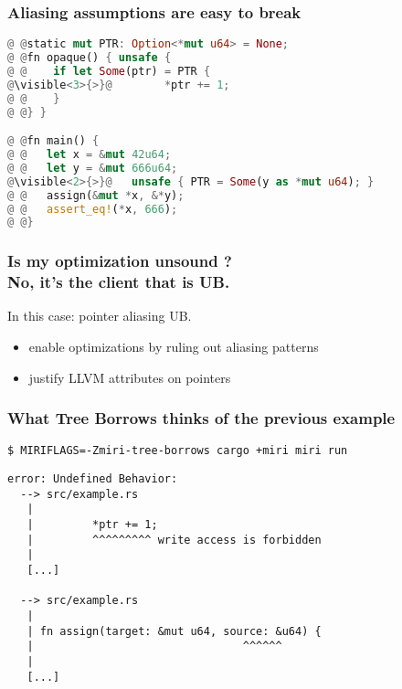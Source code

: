 \begin{frame}[fragile]
    \frametitle{Aliasing assumptions are easy to break}
    \begin{block}{}
        \begin{lstlisting}[language=rust, escapechar=@]
@ @static mut PTR: Option<*mut u64> = None;
@ @fn opaque() { unsafe {
@ @    if let Some(ptr) = PTR {
@\visible<3>{>}@        *ptr += 1;
@ @    }
@ @} }

@ @fn main() {
@ @   let x = &mut 42u64;
@ @   let y = &mut 666u64;
@\visible<2>{>}@   unsafe { PTR = Some(y as *mut u64); }
@ @   assign(&mut *x, &*y);
@ @   assert_eq!(*x, 666);
@ @}
        \end{lstlisting}
    \end{block}
\end{frame}

\begin{frame}
    \frametitle{Is my optimization unsound ?\\No, it's the client that is UB.}
    In this case: pointer aliasing UB.

    \begin{itemize}
        \item enable optimizations by ruling out aliasing patterns
        \item justify LLVM attributes on pointers
    \end{itemize}
\end{frame}

\begin{frame}[fragile]
    \frametitle{What Tree Borrows thinks of the previous example}
    \texttt{\$ MIRIFLAGS=-Zmiri-tree-borrows cargo +miri miri run}
        \begin{lstlisting}
error: Undefined Behavior:
  --> src/example.rs
   |
   |         *ptr += 1;
   |         ^^^^^^^^^ write access is forbidden
   |
   [...]

  --> src/example.rs
   |
   | fn assign(target: &mut u64, source: &u64) {
   |                                ^^^^^^
   |
   [...]
        \end{lstlisting}
\end{frame}

